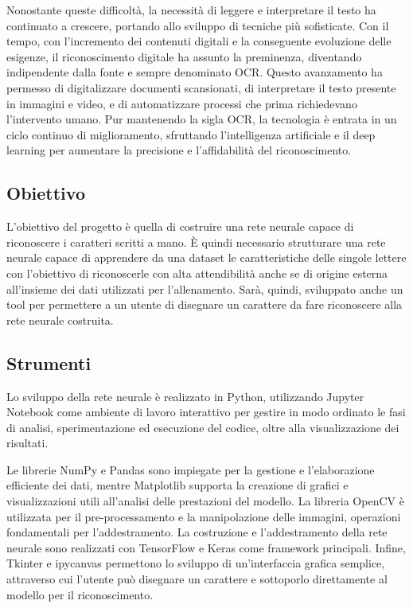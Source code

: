 \documentclass[a4paper,12pt]{article}
\begin{document}
Nonostante queste difficoltà, la necessità di leggere e interpretare il testo ha continuato a crescere, portando allo sviluppo di tecniche più sofisticate. Con il tempo, con l'incremento dei contenuti digitali e la conseguente evoluzione delle esigenze, il riconoscimento digitale ha assunto la preminenza, diventando indipendente dalla fonte e sempre denominato OCR. Questo avanzamento ha permesso di digitalizzare documenti scansionati, di interpretare il testo presente in immagini e video, e di automatizzare processi che prima richiedevano l'intervento umano. Pur mantenendo la sigla OCR, la tecnologia è entrata in un ciclo continuo di miglioramento, sfruttando l'intelligenza artificiale e il deep learning per aumentare la precisione e l'affidabilità del riconoscimento.

\subsection{Obiettivo}
L'obiettivo del progetto è quella di costruire una rete neurale capace di riconoscere i caratteri scritti a mano.
È quindi necessario strutturare una rete neurale capace di apprendere da una dataset le caratteristiche delle singole lettere con l'obiettivo di riconoscerle con alta attendibilità anche se di origine esterna all'insieme dei dati utilizzati per l'allenamento.
Sarà, quindi, sviluppato anche un tool per permettere a un utente di disegnare un carattere da fare riconoscere alla rete neurale costruita.

\subsection{Strumenti}
Lo sviluppo della rete neurale è realizzato in Python, utilizzando Jupyter Notebook come ambiente di lavoro interattivo per gestire in modo ordinato le fasi di analisi, sperimentazione ed esecuzione del codice, oltre alla visualizzazione dei risultati.

Le librerie NumPy e Pandas sono impiegate per la gestione e l'elaborazione efficiente dei dati, mentre Matplotlib supporta la creazione di grafici e visualizzazioni utili all'analisi delle prestazioni del modello.
La libreria OpenCV è utilizzata per il pre-processamento e la manipolazione delle immagini, operazioni fondamentali per l'addestramento.
La costruzione e l'addestramento della rete neurale sono realizzati con TensorFlow e Keras come framework principali. Infine, Tkinter e ipycanvas permettono lo sviluppo di un'interfaccia grafica semplice, attraverso cui l'utente può disegnare un carattere e sottoporlo direttamente al modello per il riconoscimento.
\end{document}
